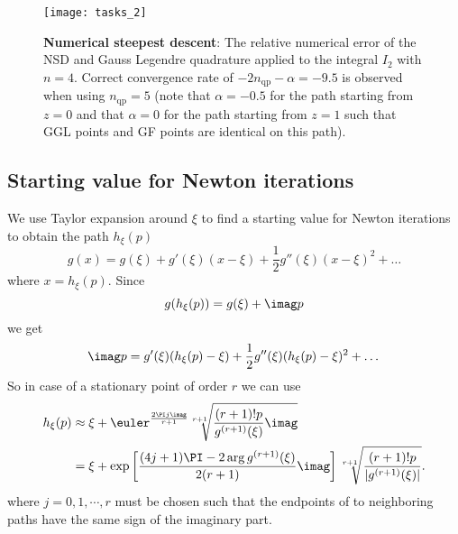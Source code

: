 \begin{figure}
	\centering
	\texttt{[image: tasks\_2]}
	\caption{\textbf{Numerical steepest descent}: The relative numerical error of the NSD and Gauss Legendre quadrature applied to the integral $I_2$ with $n=4$. Correct convergence rate of $-2n_{\mathrm{qp}}-\alpha=-9.5$ is observed when using $n_{\mathrm{qp}}=5$ (note that $\alpha=-0.5$ for the path starting from $z=0$ and that $\alpha=0$ for the path starting from $z=1$ such that GGL points and GF points are identical on this path).}
	\label{Fig4:tasks_2}
\end{figure}

\subsection{Starting value for Newton iterations}
We use Taylor expansion around $\xi$ to find a starting value for Newton iterations to obtain the path $h_\xi(p)$
\begin{equation*}
	g(x) = g(\xi) + g'(\xi)(x-\xi) + \frac{1}{2}g''(\xi)(x-\xi)^2 + \dots
\end{equation*}
where $x=h_\xi(p)$. Since 
\begin{equation}\label{Eq4:path}
	g(h_\xi(p)) = g(\xi)+\imag p
\end{equation}
we get
\begin{equation*}
	\imag p = g'(\xi)(h_\xi(p)-\xi) + \frac{1}{2}g''(\xi)(h_\xi(p)-\xi)^2 + \dots
\end{equation*}
So in case of a stationary point of order $r$ we can use
\begin{align*}
	h_\xi(p) &\approx \xi + \euler^{\frac{2\PI j\imag}{r+1}}\sqrt[r+1]{\frac{(r+1)!p}{g^{(r+1)}(\xi)}\imag} \\
	&= \xi + \exp\left[\frac{(4j+1)\PI  - 2\arg{g^{(r+1)}(\xi)}}{2(r+1)}\imag\right]\sqrt[r+1]{\frac{(r+1)!p}{|g^{(r+1)}(\xi)|}}.
\end{align*}
where $j=0,1,\cdots,r$ must be chosen such that the endpoints of to neighboring paths have the same sign of the imaginary part.

